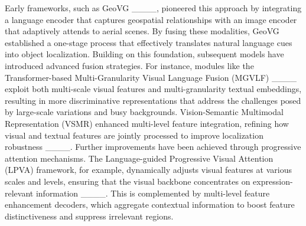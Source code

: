 Early frameworks, such as GeoVG ____, pioneered this approach by integrating a language encoder that captures geospatial relationships with an image encoder that adaptively attends to aerial scenes. By fusing these modalities, GeoVG established a one-stage process that effectively translates natural language cues into object localization. Building on this foundation, subsequent models have introduced advanced fusion strategies. For instance, modules like the Transformer-based Multi-Granularity Visual Language Fusion (MGVLF) ____ exploit both multi-scale visual features and multi-granularity textual embeddings, resulting in more discriminative representations that address the challenges posed by large-scale variations and busy backgrounds. Vision-Semantic Multimodal Representation (VSMR) enhanced multi-level feature integration, refining how visual and textual features are jointly processed to improve localization robustness ____. Further improvements have been achieved through progressive attention mechanisms. The Language-guided Progressive Visual Attention (LPVA) framework, for example, dynamically adjusts visual features at various scales and levels, ensuring that the visual backbone concentrates on expression-relevant information ____. This is complemented by multi-level feature enhancement decoders, which aggregate contextual information to boost feature distinctiveness and suppress irrelevant regions.